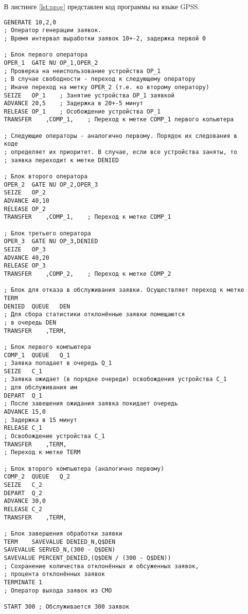 В листинге \ref{lst:prog} представлен код программы на языке GPSS.

\begin{lstlisting}[caption = {Реализация модели}, label=lst:prog]
GENERATE 10,2,0
; Оператор генерации заявок. 
; Время интервал выработки заявок 10+-2, задержка первой 0

; Блок первого оператора
OPER_1	GATE NU	OP_1,OPER_2	
; Проверка на неиспользование устройства OP_1
; В случае свободности - переход к следующему оператору
; Иначе переход на метку OPER_2 (т.е. ко второму оператору)
SEIZE	OP_1	; Занятие устройства OP_1 заявкой
ADVANCE	20,5	; Задержка в 20+-5 минут
RELEASE	OP_1	; Особождение устройства OP_1
TRANSFER	,COMP_1,	; Переход к метке COMP_1 первого копьютера

; Следующие операторы - аналогично первому. Порядок их следования в коде
; определяет их приоритет. В случае, если все устройства заняты, то
; заявка переходит к метке DENIED	

; Блок второго оператора
OPER_2	GATE NU	OP_2,OPER_3
SEIZE	OP_2
ADVANCE	40,10
RELEASE	OP_2
TRANSFER	,COMP_1,	; Переход к метке COMP_1

; Блок третьего оператора
OPER_3	GATE NU	OP_3,DENIED
SEIZE	OP_3
ADVANCE	40,20
RELEASE	OP_3
TRANSFER	,COMP_2,	; Переход к метке COMP_2

; Блок для отказа в обслуживания заявки. Осуществляет переход к метке TERM
DENIED	QUEUE 	DEN
; Для сбора статистики отклонённые заявки помещаются
; в очередь DEN
TRANSFER	,TERM,

; Блок первого компьютера
COMP_1	QUEUE	Q_1	
; Заявка попадает в очередь Q_1
SEIZE	C_1	
; Заявка ожидает (в порядке очереди) освобождения устройства C_1
; для обслуживания им
DEPART	Q_1	
; После завешения ожидания заявка покидает очередь
ADVANCE	15,0
; Задержка в 15 минут
RELEASE	C_1
; Освобождение устройства C_1 
TRANSFER	,TERM,
; Переход к метке TERM

; Блок второго компьютера (аналогично первому)
COMP_2	QUEUE	Q_2
SEIZE	C_2
DEPART	Q_2
ADVANCE	30,0
RELEASE	C_2
TRANSFER	,TERM,

; Блок завершения обработки заявки
TERM	SAVEVALUE DENIED_N,Q$DEN
SAVEVALUE SERVED_N,(300 - Q$DEN)
SAVEVALUE PERCENT_DENIED,(Q$DEN / (300 - Q$DEN))
; Сохранение количества отклонённых и обсуженных заявок, 
; процента отклонённых заявок
TERMINATE 1
; Оператор выхода заявок из СМО

START 300 ; Обслуживается 300 заявок

\end{lstlisting}
